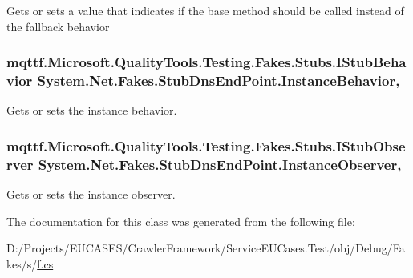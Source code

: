 Gets or sets a value that indicates if the base method should be called instead of the fallback behavior

\hypertarget{class_system_1_1_net_1_1_fakes_1_1_stub_dns_end_point_a6fe7fff14f46bdc93581d2bfa4f4b6f4}{
\subsubsection[{Instance\-Behavior}]{\setlength{\rightskip}{0pt plus 5cm}mqttf.\-Microsoft.\-Quality\-Tools.\-Testing.\-Fakes.\-Stubs.\-I\-Stub\-Behavior System.\-Net.\-Fakes.\-Stub\-Dns\-End\-Point.\-Instance\-Behavior\hspace{0.3cm}{\ttfamily [get]}, {\ttfamily [set]}}}\label{class_system_1_1_net_1_1_fakes_1_1_stub_dns_end_point_a6fe7fff14f46bdc93581d2bfa4f4b6f4}


Gets or sets the instance behavior.

\hypertarget{class_system_1_1_net_1_1_fakes_1_1_stub_dns_end_point_abca74756c5c2b09d10d3e9e559f53b41}{
\subsubsection[{Instance\-Observer}]{\setlength{\rightskip}{0pt plus 5cm}mqttf.\-Microsoft.\-Quality\-Tools.\-Testing.\-Fakes.\-Stubs.\-I\-Stub\-Observer System.\-Net.\-Fakes.\-Stub\-Dns\-End\-Point.\-Instance\-Observer\hspace{0.3cm}{\ttfamily [get]}, {\ttfamily [set]}}}\label{class_system_1_1_net_1_1_fakes_1_1_stub_dns_end_point_abca74756c5c2b09d10d3e9e559f53b41}


Gets or sets the instance observer.



The documentation for this class was generated from the following file\-:\begin{DoxyCompactItemize}
\item 
D\-:/\-Projects/\-E\-U\-C\-A\-S\-E\-S/\-Crawler\-Framework/\-Service\-E\-U\-Cases.\-Test/obj/\-Debug/\-Fakes/s/\hyperlink{s_2f_8cs}{f.\-cs}\end{DoxyCompactItemize}
